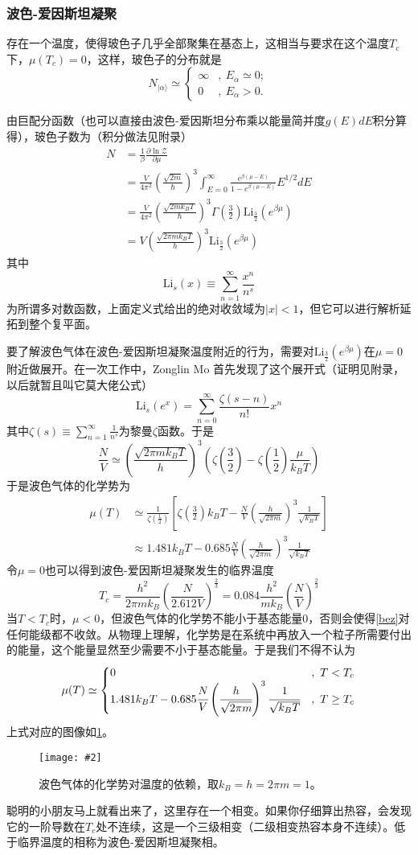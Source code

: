 \documentclass[a4paper,11pt]{ctexart}
\newcommand{\beq}{\begin{equation}}
\newcommand{\eeq}{\end{equation}}
\newcommand{\bea}{\begin{equation}\begin{aligned}}
\newcommand{\eea}{\end{aligned}\end{equation}}
\newcommand{\red}{\color{red}}
\newcommand{\grandz}{\mathcal{Z}}
\newcommand{\Li}[1]{\mathrm{Li}_{#1}}
\newcommand{\cpic}[2]{
\begin{center}
\texttt{[image: \#2]}
\end{center}
}
\newcommand{\cpicn}[3]
{
\begin{figure}[H]
\cpic{#1}{#2}
\caption{#3\label{#2}}
\end{figure}
}
\begin{document}
\subsubsection{波色-爱因斯坦凝聚}
存在一个温度，使得玻色子几乎全部聚集在基态上，这相当与要求在这个温度$T_c$下，$\mu(T_c) = 0$，这样，玻色子的分布就是
\beq
N_{|\alpha \rangle} \simeq \begin{cases} \infty &,\ E_\alpha \simeq 0; \\ 0&,\ E_\alpha > 0. 
\end{cases}
\eeq
\par
由巨配分函数（也可以直接由波色-爱因斯坦分布乘以能量简并度$g(E)dE$积分算得），玻色子数为（积分做法见附录）
\bea
N &= \frac{1}{\beta} \frac{\partial \ln \grandz}{\partial \mu}\\
&= \frac{V}{4\pi^2} \left(\frac{\sqrt{2m}}{\hbar}\right)^3 \int_{E=0}^\infty \frac{e^{\beta (\mu - E)}}{1 - e^{\beta (\mu - E)}} E^{1/2} dE \\
&= \frac{V}{4\pi^2} \left(\frac{\sqrt{2mk_B T}}{\hbar} \right)^3 \Gamma \left(\frac{3}{2}\right) \Li{\frac{3}{2}} (e^{\beta \mu}) \\
&= V \left(\frac{\sqrt{2\pi m k_B T}}{h}\right)^3 \Li{\frac{3}{2}} (e^{\beta \mu})
\eea
其中
\beq
\Li{s}(x) \equiv \sum_{n=1}^\infty \frac{x^n}{n^s}
\eeq
为所谓多对数函数，上面定义式给出的绝对收敛域为$|x|<1$，但它可以进行解析延拓到整个复平面。\par
要了解波色气体在波色-爱因斯坦凝聚温度附近的行为，需要对$\Li{\frac{3}{2}} (e^{\beta \mu})$在$\mu = 0$附近做展开。{\red 在一次工作中，Zonglin Mo 首先发现了这个展开式}（证明见附录，以后就暂且叫它莫大佬公式）
\beq
\Li{s} (e^x) = \sum_{n=0}^\infty \frac{\zeta(s-n)}{n!} x^n
\eeq
其中$\zeta(s) \equiv \sum_{n=1}^\infty \frac{1}{n^s}$为黎曼$\zeta$函数。于是
\beq
\frac{N}{V} \simeq \left(\frac{\sqrt{2\pi m k_B T}}{h}\right)^3 \left( \zeta \left(\frac{3}{2}\right) -\zeta \left(\frac{1}{2}\right) \frac{\mu}{k_B T}\right)
\eeq
于是波色气体的化学势为
\bea
\mu(T) &\simeq  \frac{1}{\zeta \left(\frac{1}{2}\right)} \left[ \zeta \left(\frac{3}{2}\right) k_B T - \frac{N}{V} \left( \frac{h}{\sqrt{2\pi m}}\right)^3 \frac{1}{\sqrt{k_B T}} \right] \\
&\approx 1.481 k_B T - 0.685 \frac{N}{V} \left( \frac{h}{\sqrt{2\pi m}}\right)^3 \frac{1}{\sqrt{k_B T}}
\eea
令$\mu = 0$也可以得到波色-爱因斯坦凝聚发生的临界温度
\beq
T_c = \frac{h^2}{2\pi m k_B} \left( \frac{N}{2.612V} \right)^{\frac{2}{3}} = 0.084 \frac{h^2}{mk_B} \left( \frac{N}{V}\right)^{\frac{2}{3}}
\eeq
当$T<T_c$时，$\mu <0$，但波色气体的化学势不能小于基态能量0，否则会使得\cref{bez}对任何能级都不收敛。从物理上理解，化学势是在系统中再放入一个粒子所需要付出的能量，这个能量显然至少需要不小于基态能量。于是我们不得不认为
\beq
\mu(T) \simeq \begin{cases} 0 &,\ T<T_c \\
1.481 k_B T - 0.685 \cfrac{N}{V} \left( \cfrac{h}{\sqrt{2\pi m}}\right)^3 \cfrac{1}{\sqrt{k_B T}}&,\ T\geq T_c
\end{cases}
\eeq
上式对应的图像如\cref{bec_mu}。
\cpicn{0.45}{bec_mu}{波色气体的化学势对温度的依赖，取$k_B = h = 2\pi m = 1$。}
聪明的小朋友马上就看出来了，这里存在一个相变。如果你仔细算出热容，会发现它的一阶导数在$T_c$处不连续，这是一个三级相变（二级相变热容本身不连续）。低于临界温度的相称为{\red 波色-爱因斯坦凝聚相}。
\end{document}
